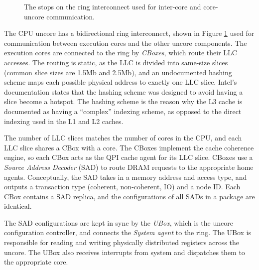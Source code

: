 
\begin{figure}[hbt]
  \caption{
    The stops on the ring interconnect used for inter-core and core-uncore
    communication.
  }
  \label{fig:cpu_uncore}
\end{figure}

The CPU uncore has a bidirectional ring interconnect, shown in Figure
\ref{fig:cpu_uncore} used for communication between execution cores and the
other uncore components. The execution cores are connected to the ring by
\textit{CBoxes}, which route their LLC accesses. The routing is static, as the
LLC is divided into same-size slices (common slice sizes are 1.5Mb and 2.5Mb),
and an undocumented hashing scheme maps each possible physical address to
exactly one LLC slice. Intel's documentation states that the hashing scheme was
designed to avoid having a slice become a hotspot. The hashing scheme is the
reason why the L3 cache is documented as having a ``complex'' indexing scheme,
as opposed to the direct indexing used in the L1 and L2 caches.

The number of LLC slices matches the number of cores in the CPU, and each LLC
slice shares a CBox with a core. The CBoxes implement the cache coherence
engine, so each CBox acts as the QPI cache agent for its LLC slice. CBoxes
use a \textit{Source Address Decoder} (SAD) to route DRAM requests to the
appropriate home agents. Conceptually, the SAD takes in a memory address and
access type, and outputs a transaction type (coherent, non-coherent, IO) and a
node ID. Each CBox contains a SAD replica, and the configurations of all SADs
in a package are identical.

The SAD configurations are kept in sync by the \textit{UBox}, which is the
uncore configuration controller, and connects the \textit{System agent} to the
ring. The UBox is responsible for reading and writing physically distributed
registers across the uncore. The UBox also receives interrupts from system and
dispatches them to the appropriate core.

